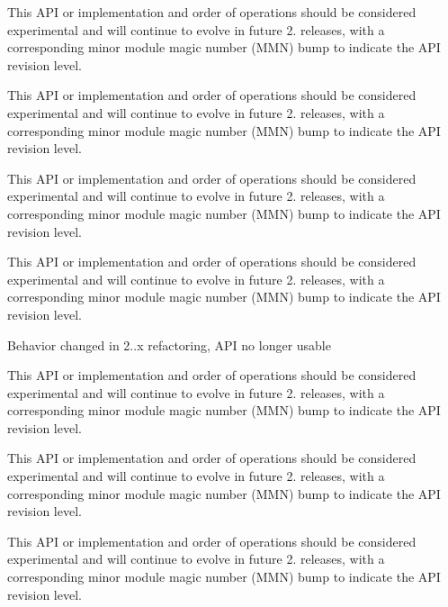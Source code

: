 
\begin{DoxyRefList}
\item[\label{bug__bug000003}%
\hypertarget{bug__bug000003}{}%
Global \hyperlink{group__APACHE__CORE__MUTEX_ga354bb6f9a53786fa1259e061ced592e2}{A\+P\+\_\+\+D\+E\+C\+L\+A\+RE} (apr\+\_\+status\+\_\+t) ap\+\_\+parse\+\_\+mutex(const char $\ast$arg]This A\+PI or implementation and order of operations should be considered experimental and will continue to evolve in future 2. releases, with a corresponding minor module magic number (M\+MN) bump to indicate the A\+PI revision level. 

This A\+PI or implementation and order of operations should be considered experimental and will continue to evolve in future 2. releases, with a corresponding minor module magic number (M\+MN) bump to indicate the A\+PI revision level. 

This A\+PI or implementation and order of operations should be considered experimental and will continue to evolve in future 2. releases, with a corresponding minor module magic number (M\+MN) bump to indicate the A\+PI revision level. 

This A\+PI or implementation and order of operations should be considered experimental and will continue to evolve in future 2. releases, with a corresponding minor module magic number (M\+MN) bump to indicate the A\+PI revision level. 

Behavior changed in 2..\+x refactoring, A\+PI no longer usable  
\item[\label{bug__bug000003}%
\hypertarget{bug__bug000003}{}%
Global \hyperlink{group__APACHE__CORE__MUTEX_ga354bb6f9a53786fa1259e061ced592e2}{A\+P\+\_\+\+D\+E\+C\+L\+A\+RE} (apr\+\_\+status\+\_\+t) ap\+\_\+parse\+\_\+mutex(const char $\ast$arg]This A\+PI or implementation and order of operations should be considered experimental and will continue to evolve in future 2. releases, with a corresponding minor module magic number (M\+MN) bump to indicate the A\+PI revision level. 

This A\+PI or implementation and order of operations should be considered experimental and will continue to evolve in future 2. releases, with a corresponding minor module magic number (M\+MN) bump to indicate the A\+PI revision level. 

This A\+PI or implementation and order of operations should be considered experimental and will continue to evolve in future 2. releases, with a corresponding minor module magic number (M\+MN) bump to indicate the A\+PI revision level. 


\end{DoxyRefList}
